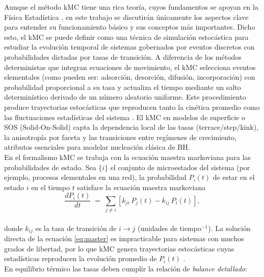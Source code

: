 \documentclass[12pt,letterpaper,oneside]{report}
\begin{document}
Aunque el método kMC tiene una rica teoría, cuyos fundamentos se apoyan en la Física Estadística \cite{Kratzer2009}, en este trabajo se discutirán únicamente los aspectos clave para entender su funcionamiento básico y sus conceptos más importantes. Dicho esto, el kMC se puede definir como una técnica de simulación estocástica para estudiar la evolución temporal de sistemas gobernados por eventos discretos con probabilidades dictadas por tasas de transición. A diferencia de los métodos deterministas que integran ecuaciones de movimiento, el kMC selecciona eventos elementales (como pueden ser: adsorción, desorción, difusión, incorporación) con probabilidad proporcional a su tasa y actualiza el tiempo mediante un salto determinístico derivado de un número aleatorio uniforme. Este procedimiento produce trayectorias estocásticas que reproducen tanto la cinética promedio como las fluctuaciones estadísticas del sistema \cite{Andersen2019}. El kMC en modelos de superficie o SOS (Solid-On-Solid) capta la dependencia local de las tasas (terrace/step/kink), la anisotropía por faceta y las transiciones entre regímenes de crecimiento, atributos esenciales para modelar nucleación clásica de BH.\\



En el formalismo kMC se trabaja con la ecuación maestra markoviana para las probabilidades de estado. Sea \(\{i\}\) el conjunto de microestados del sistema (por ejemplo, procesos elementales en una red), la probabilidad \(P_i(t)\) de estar en el estado \(i\) en el tiempo \(t\) satisface la ecuación maestra markoviana\\

\begin{equation}\label{eq:master}
\frac{dP_i(t)}{dt} \;=\; \sum_{j\neq i}\left[ k_{j i}\,P_j(t) - k_{i j}\,P_i(t)\right],
\end{equation}\\

\noindent donde \(k_{ij}\) es la tasa de transición de \(i\to j\) (unidades de tiempo\(^{-1}\)). La solución directa de la ecuación  \eqref{eq:master} es impracticable para sistemas con muchos grados de libertad, por lo que kMC genera trayectorias estocásticas cuyas estadísticas reproducen la evolución promedio de \(P_i(t)\) \cite{Andersen2019}.\\

En equilibrio térmico las tasas deben cumplir la relación de \emph{balance detallado}: \\
\end{document}
